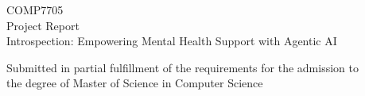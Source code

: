 \begin{titlepage}
\begin{center}

\vspace{30pt} %
\begin{center}
    {COMP7705}\\[10pt] %
    {Project Report}\\ %
    {Introspection: Empowering Mental Health Support with Agentic AI}\\[20pt] %
\end{center}

\vspace{40pt} %


\begin{center}
    {Submitted in partial fulfillment of the requirements for the admission to\\
    the degree of Master of Science in Computer Science}\\[20pt]
\end{center}


\end{center}
\end{titlepage}
